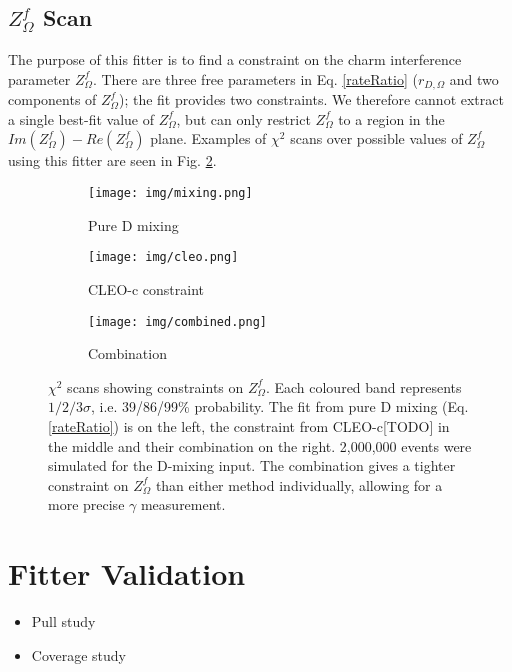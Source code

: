 \documentclass[note.tex]{subfiles}
\begin{document}
\subsection{$Z_\Omega^f$ Scan}
The purpose of this fitter is to find a constraint on the charm interference parameter $Z_\Omega^f$.
There are three free parameters in Eq. \ref{rateRatio} ($r_{D, \Omega}$ and two components of $Z_\Omega^f$);
the fit provides two constraints. We therefore cannot extract a single best-fit value of $Z_\Omega^f$, but can only restrict $Z_\Omega^f$ to a region in the $Im(Z_\Omega^f) - Re(Z_\Omega^f)$ plane.
Examples of $\chi^2$ scans over possible values of $Z_\Omega^f$ using this fitter are seen in Fig. \ref{Z scans}.

\begin{figure}[htb!]
    \begin{subfigure}[htb!]{0.3\linewidth}
        \texttt{[image: img/mixing.png]}
        \caption{Pure D mixing}
        \label{mixing scan}
    \end{subfigure}
    \begin{subfigure}[htb!]{0.3\linewidth}
        \texttt{[image: img/cleo.png]}
        \caption{CLEO-c constraint}
    \end{subfigure}
    \begin{subfigure}[htb!]{0.3\linewidth}
        \texttt{[image: img/combined.png]}
        \caption{Combination}
    \end{subfigure}
    \centering
    \caption{$\chi^2$ scans showing constraints on $Z_\Omega^f$.
        Each coloured band represents $1/2/3\sigma$, i.e. 39/86/99\% probability.
        The fit from pure D mixing (Eq. \ref{rateRatio}) is on the left, the constraint from CLEO-c[TODO] in the middle and their combination on the right.
        2,000,000 events were simulated for the D-mixing input.
        The combination gives a tighter constraint on $Z_\Omega^f$ than either method individually, allowing for a more precise $\gamma$ measurement.}
    \label{Z scans}
\end{figure}


\section{Fitter Validation}
\begin{itemize}
    \item Pull study
    \item Coverage study
\end{itemize}
\end{document}
